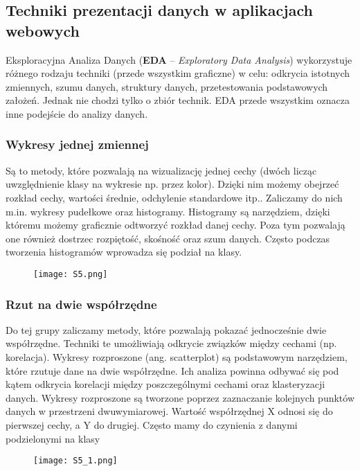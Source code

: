 \subsection{Techniki prezentacji danych w aplikacjach webowych}

Eksploracyjna Analiza Danych (\textbf{EDA} – \textit{Exploratory Data Analysis}) wykorzystuje różnego rodzaju techniki (przede wszystkim graficzne) w celu: odkrycia istotnych zmiennych, szumu danych, struktury danych, przetestowania podstawowych założeń. Jednak nie chodzi tylko o zbiór technik. EDA przede wszystkim oznacza inne podejście do analizy danych.

\subsubsection{Wykresy jednej zmiennej}

Są to metody, które pozwalają na wizualizację jednej cechy (dwóch licząc uwzględnienie klasy na wykresie np. przez kolor). Dzięki nim możemy obejrzeć rozkład cechy, wartości średnie, odchylenie standardowe itp.. Zaliczamy do nich m.in. wykresy pudełkowe oraz histogramy. Histogramy są narzędziem, dzięki któremu możemy graficznie odtworzyć rozkład danej cechy. Poza tym pozwalają one również dostrzec rozpiętość, skośność oraz szum danych. Często podczas tworzenia histogramów wprowadza się podział na klasy.

\begin{figure}[H]
	\centering
	\texttt{[image: S5.png]}
\end{figure}

\subsubsection{Rzut na dwie współrzędne}

Do tej grupy zaliczamy metody, które pozwalają pokazać jednocześnie dwie współrzędne. Techniki te umożliwiają odkrycie związków między cechami (np. korelacja). Wykresy rozproszone (ang. scatterplot) są podstawowym narzędziem, które rzutuje dane na dwie współrzędne. Ich analiza powinna odbywać się pod kątem odkrycia korelacji między poszczególnymi cechami oraz klasteryzacji danych. Wykresy rozproszone są tworzone poprzez zaznaczanie kolejnych punktów danych w przestrzeni dwuwymiarowej. Wartość współrzędnej X odnosi się do pierwszej cechy, a Y do drugiej. Często mamy do czynienia z danymi podzielonymi na klasy

\begin{figure}[H]
	\centering
	\texttt{[image: S5\_1.png]}
\end{figure}

